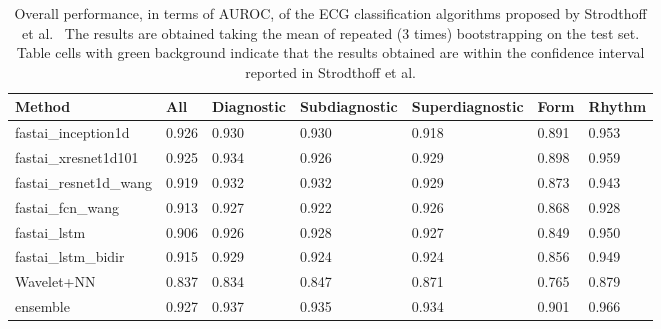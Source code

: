 \begin{table}[h]
\scriptsize
\caption{Overall performance, in terms of AUROC, of the ECG classification algorithms proposed by Strodthoff et al.~\cite{strodthoff_deep_2021} The results are obtained taking the mean of repeated (3 times) bootstrapping on the test set. Table cells with green background indicate that the results obtained are within the confidence interval reported in Strodthoff et al.}
\begin{tabular}{lllllll}
\cellcolor[HTML]{C0C0C0}\textbf{Method} & \cellcolor[HTML]{C0C0C0}\textbf{All} & \cellcolor[HTML]{C0C0C0}\textbf{Diagnostic} & \cellcolor[HTML]{C0C0C0}\textbf{Subdiagnostic} & \cellcolor[HTML]{C0C0C0}\textbf{Superdiagnostic} & \cellcolor[HTML]{C0C0C0}\textbf{Form} & \cellcolor[HTML]{C0C0C0}\textbf{Rhythm} \\\hline
fastai\_inception1d    & \cellcolor{green!25} 0.926 & \cellcolor{green!25} 0.930 & \cellcolor{green!25} 0.930 & \cellcolor{green!25} 0.918 & \cellcolor{green!25} 0.891 & \cellcolor{green!25} 0.953 \\
fastai\_xresnet1d101   & \cellcolor{green!25} 0.925 & \cellcolor{green!25} 0.934 & \cellcolor{green!25} 0.926 & \cellcolor{green!25} 0.929 & \cellcolor{green!25} 0.898 & \cellcolor{green!25} 0.959 \\
fastai\_resnet1d\_wang & \cellcolor{green!25} 0.919 & \cellcolor{green!25} 0.932 & \cellcolor{green!25} 0.932 & \cellcolor{green!25} 0.929 & \cellcolor{green!25} 0.873 & \cellcolor{green!25} 0.943 \\
fastai\_fcn\_wang      & \cellcolor{green!25} 0.913 & \cellcolor{green!25} 0.927 & \cellcolor{green!25} 0.922 & \cellcolor{green!25} 0.926 & \cellcolor{green!25} 0.868 & \cellcolor{green!25} 0.928 \\
fastai\_lstm           & \cellcolor{green!25} 0.906 & \cellcolor{green!25} 0.926 & \cellcolor{green!25} 0.928 & \cellcolor{green!25} 0.927 & \cellcolor{green!25} 0.849 & \cellcolor{green!25} 0.950 \\
fastai\_lstm\_bidir    & \cellcolor{green!25} 0.915 & \cellcolor{green!25} 0.929 & \cellcolor{green!25} 0.924 & \cellcolor{green!25} 0.924 & \cellcolor{red!25} 0.856   & \cellcolor{green!25} 0.949 \\
Wavelet+NN             & \cellcolor{green!25} 0.837 & \cellcolor{red!25} 0.834   & \cellcolor{green!25} 0.847 & \cellcolor{green!25} 0.871 & \cellcolor{green!25} 0.765 & \cellcolor{green!25} 0.879 \\
ensemble               & \cellcolor{green!25} 0.927 & \cellcolor{green!25} 0.937 & \cellcolor{green!25} 0.935 & \cellcolor{green!25} 0.934 & \cellcolor{green!25} 0.901 & \cellcolor{green!25} 0.966 \\\hline                            
\end{tabular}
\label{tab:rep_main}
\end{table}



